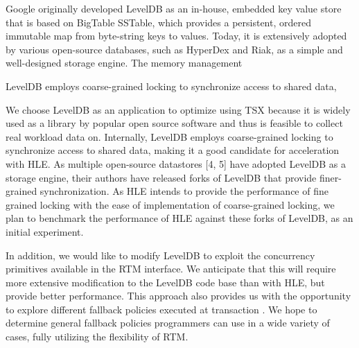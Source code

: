 \documentclass{acm_proc_article-sp}
\begin{document}
Google originally developed LevelDB as an in-house, embedded key value store that is based on BigTable SSTable, which provides a persistent, ordered immutable map from byte-string keys to values. Today, it is extensively adopted by various open-source databases, such as HyperDex and Riak, as a simple and well-designed storage engine. The memory management

 LevelDB employs coarse-grained locking to synchronize access to shared data, 


We choose LevelDB as an application to optimize using TSX because it is widely used as a library by popular open source software and thus is feasible to collect real workload data on. Internally, LevelDB employs coarse-grained locking to synchronize access to shared data, making it a good candidate for acceleration with HLE. As multiple open-source datastores [4, 5] have adopted LevelDB as a storage engine, their authors have released forks of LevelDB that provide finer-grained synchronization. As HLE intends to provide the performance of fine grained locking with the ease of implementation of coarse-grained locking, we plan to benchmark the performance of HLE against these forks of LevelDB, as an initial experiment. 

In addition, we would like to modify LevelDB to exploit the concurrency primitives available in the RTM interface. We anticipate that this will require more extensive modification to the LevelDB code base than with HLE, but provide better performance. This approach also provides us with the opportunity to explore different fallback policies executed at transaction . We hope to determine general fallback policies programmers can use in a wide variety of cases, fully utilizing the flexibility of RTM.







\end{document}
